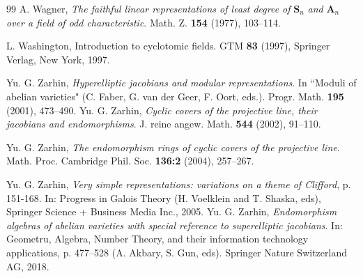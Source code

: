 \documentclass[12pt,a4paper,reqno]{amsart}
\def\Sn{{\mathbf S}_n}
\def\An{{\mathbf A}_n}
\theoremstyle{definition}
\begin{document}
\begin{thebibliography}{99}
 A. Wagner, {\em The faithful linear representations of least degree of} $\Sn$ {\em and} $\An$ {\em over a field of odd characteristic}.
 Math. Z. {\bf 154} (1977), 103--114.
 
  L. Washington, Introduction to cyclotomic fields. GTM {\bf 83} (1997), Springer Verlag, New York, 1997.


 Yu. G. Zarhin, {\em Hyperelliptic jacobians and modular representations}. In  ``Moduli of abelian varieties" (C. Faber, G. van der Geer, F. Oort, eds.).
Progr. Math. {\bf 195} (2001), 473--490.
 Yu. G. Zarhin, {\em Cyclic covers of the projective line, their jacobians and endomorphisms}. J. reine angew. Math. {\bf 544} (2002), 91--110.

 Yu. G. Zarhin, {\em The endomorphism rings of cyclic covers of the projective line}. Math. Proc. Cambridge Phil. Soc.  {\bf 136:2} (2004), 257--267.

 Yu. G. Zarhin, {\em Very simple representations: variations on a theme of Clifford}, p. 151-168. In: Progress in Galois Theory (H. Voelklein and T. Shaska, eds), 
Springer Science + Business Media Inc., 2005.
 Yu. G. Zarhin, {\em Endomorphism algebras of abelian varieties with special reference to superelliptic jacobians}. In: Geometru, Algebra, Number Theory, and their 
information technology applications, p. 477--528 (A. Akbary, S. Gun, eds). Springer Nature Switzerland AG, 2018.
\end{thebibliography}
\end{document}
